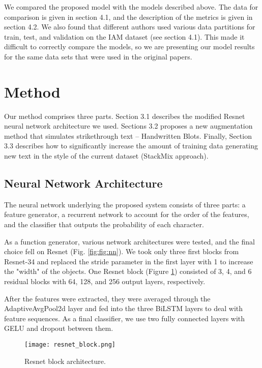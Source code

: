 \documentclass[10pt,twocolumn,letterpaper]{article}
\begin{document}
We compared the proposed model with the models described above. The data for comparison is given in section 4.1, and the description of the metrics is given in section 4.2. We also found that different authors used various data partitions for train, test, and validation on the IAM dataset (see section 4.1). This made it difficult to correctly compare the models, so we are presenting our model results for the same data sets that were used in the original papers.







\section{Method}

Our method comprises three parts. Section 3.1 describes the modified Resnet neural network architecture we used. Sections 3.2 proposes a new augmentation method that simulates strikethrough text – Handwritten Blots. Finally, Section 3.3 describes how to significantly increase the amount of training data generating new text in the style of the current dataset (StackMix approach).

\subsection{Neural Network Architecture}

The neural network underlying the proposed system consists of three parts: a feature generator, a recurrent network to account for the order of the features, and the classifier that outputs the probability of each character.

As a function generator, various network architectures were tested, and the final choice fell on Resnet (Fig. \ref{fig:fig:nn}). We took only three first blocks from Resnet-34 and replaced the stride parameter in the first layer with 1 to increase the "width" of the objects. One Resnet block (Figure \ref{fig:fig:resnet})  consisted of 3, 4, and 6 residual blocks with 64, 128, and 256 output layers, respectively.

After the features were extracted, they were averaged through the AdaptiveAvgPool2d layer and fed into the three BiLSTM layers to deal with feature sequences. As a final classifier, we use two fully connected layers with GELU and dropout between them. 

\begin{figure}[t]
\begin{center}
\texttt{[image: resnet\_block.png]}
\end{center}
   \caption{Resnet block architecture.}
\label{fig:fig:resnet}
\end{figure}
\end{document}

